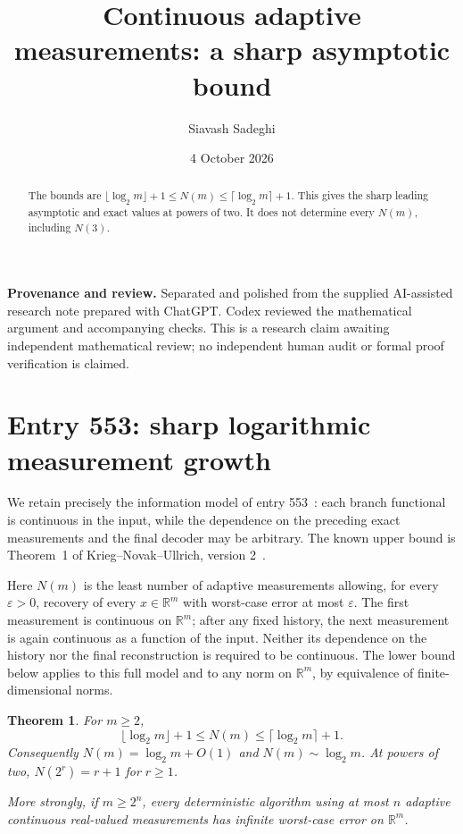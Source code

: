 \documentclass[11pt,a4paper]{article}
\newtheorem{theorem}{Theorem}[section]
\theoremstyle{remark}
\newcommand{\R}{\mathbb R}
\newcommand{\eps}{\varepsilon}
\begin{document}
\title{Continuous adaptive measurements: a sharp asymptotic bound}
\author{Siavash Sadeghi}
\date{4 October 2026}
\maketitle
\begin{abstract}
The bounds are $\lfloor\log_2m\rfloor+1\le N(m)\le\lceil\log_2m\rceil+1$. This gives the sharp leading asymptotic and exact values at powers of two. It does not determine every $N(m)$, including $N(3)$.
\end{abstract}
\textbf{Provenance and review.} Separated and polished from the supplied AI-assisted research note prepared with ChatGPT. Codex reviewed the mathematical argument and accompanying checks. This is a research claim awaiting independent mathematical review; no independent human audit or formal proof verification is claimed.
\medskip
\section{Entry 553: sharp logarithmic measurement growth}\label{sec:adaptive}

We retain precisely the information model of entry 553~\cite{repo553}: each branch functional is continuous in the input, while the dependence on the preceding exact measurements and the final decoder may be arbitrary. The known upper bound is Theorem~1 of Krieg--Novak--Ullrich, version 2~\cite{knu}.

Here $N(m)$ is the least number of adaptive measurements allowing, for every
$\eps>0$, recovery of every $x\in\R^m$ with worst-case error at most $\eps$.
The first measurement is continuous on $\R^m$; after any fixed history, the
next measurement is again continuous as a function of the input. Neither its
dependence on the history nor the final reconstruction is required to be
continuous. The lower bound below applies to this full model and to any norm
on $\R^m$, by equivalence of finite-dimensional norms.

\begin{theorem}\label{thm:adaptive}
For $m\ge2$,
\[
 \boxed{\lfloor\log_2m\rfloor+1\le N(m)
 \le\lceil\log_2m\rceil+1.}
\]
Consequently $N(m)=\log_2m+O(1)$ and $N(m)\sim\log_2m$. At powers of two, $N(2^r)=r+1$ for $r\ge1$.

More strongly, if $m\ge2^n$, every deterministic algorithm using at most $n$ adaptive continuous real-valued measurements has infinite worst-case error on $\R^m$.
\end{theorem}
\end{document}

